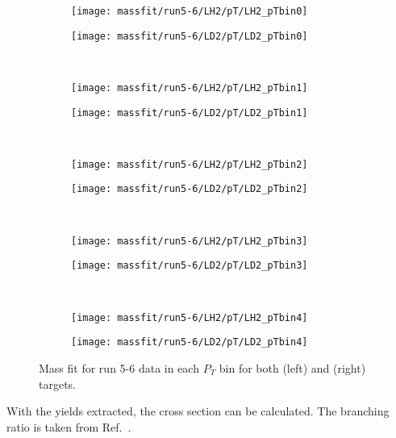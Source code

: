 \documentclass[../main.tex]{subfiles}
\begin{document}
\begin{figure}[h]
	\centering
	\begin{subfigure}{0.4\linewidth}
		\texttt{[image: massfit/run5-6/LH2/pT/LH2\_pTbin0]}
	\end{subfigure}
	\begin{subfigure}{0.4\linewidth}
		\texttt{[image: massfit/run5-6/LD2/pT/LD2\_pTbin0]}
	\end{subfigure}\\
	\begin{subfigure}{0.4\linewidth}
		\texttt{[image: massfit/run5-6/LH2/pT/LH2\_pTbin1]}
	\end{subfigure}
	\begin{subfigure}{0.4\linewidth}
		\texttt{[image: massfit/run5-6/LD2/pT/LD2\_pTbin1]}
	\end{subfigure}\\
	\begin{subfigure}{0.4\linewidth}
		\texttt{[image: massfit/run5-6/LH2/pT/LH2\_pTbin2]}
	\end{subfigure}
	\begin{subfigure}{0.4\linewidth}
		\texttt{[image: massfit/run5-6/LD2/pT/LD2\_pTbin2]}
	\end{subfigure}\\
	\begin{subfigure}{0.4\linewidth}
		\texttt{[image: massfit/run5-6/LH2/pT/LH2\_pTbin3]}
	\end{subfigure}
	\begin{subfigure}{0.4\linewidth}
		\texttt{[image: massfit/run5-6/LD2/pT/LD2\_pTbin3]}
	\end{subfigure}\\
	\begin{subfigure}{0.4\linewidth}
		\texttt{[image: massfit/run5-6/LH2/pT/LH2\_pTbin4]}
	\end{subfigure}
	\begin{subfigure}{0.4\linewidth}
		\texttt{[image: massfit/run5-6/LD2/pT/LD2\_pTbin4]}
	\end{subfigure}
	\caption{Mass fit for run 5-6 data in each $P_T$ bin for both (left) and (right) targets. }
	\label{fig:massfit_5-6_pT}
\end{figure}

With the yields extracted, the cross section can be calculated. 
The branching ratio is taken from Ref.~\cite{workman2022}.
\end{document}
